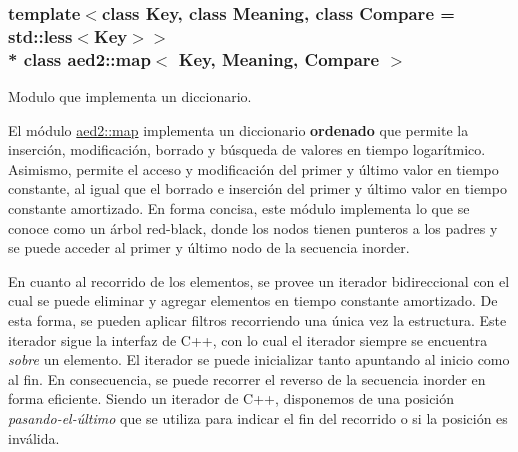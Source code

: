\subsubsection*{template$<$class Key, class Meaning, class Compare = std\+::less$<$\+Key$>$$>$\\*
class aed2\+::map$<$ Key, Meaning, Compare $>$}

Modulo que implementa un diccionario. 

El módulo \hyperlink{classaed2_1_1map}{aed2\+::map} implementa un diccionario {\bfseries ordenado} que permite la inserción, modificación, borrado y búsqueda de valores en tiempo logarítmico. Asimismo, permite el acceso y modificación del primer y último valor en tiempo constante, al igual que el borrado e inserción del primer y último valor en tiempo constante amortizado. En forma concisa, este módulo implementa lo que se conoce como un árbol red-\/black, donde los nodos tienen punteros a los padres y se puede acceder al primer y último nodo de la secuencia inorder.

En cuanto al recorrido de los elementos, se provee un iterador bidireccional con el cual se puede eliminar y agregar elementos en tiempo constante amortizado. De esta forma, se pueden aplicar filtros recorriendo una única vez la estructura. Este iterador sigue la interfaz de C++, con lo cual el iterador siempre se encuentra {\itshape sobre} un elemento. El iterador se puede inicializar tanto apuntando al inicio como al fin. En consecuencia, se puede recorrer el reverso de la secuencia inorder en forma eficiente. Siendo un iterador de C++, disponemos de una posición {\itshape pasando-\/el-\/último} que se utiliza para indicar el fin del recorrido o si la posición es inválida.


